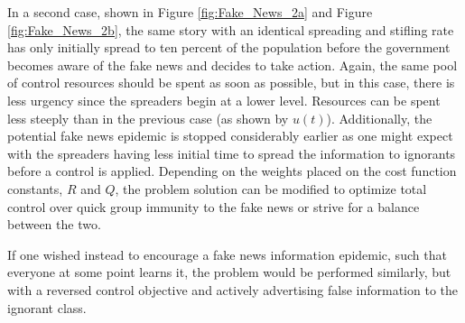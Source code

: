 In a second case, shown in Figure \ref{fig:Fake_News_2a} and Figure \ref{fig:Fake_News_2b}, the same story with an identical spreading and stifling rate has only initially spread to ten percent of the population before the government becomes aware of the fake news and decides to take action. Again, the same pool of control resources should be spent as soon as possible, but in this case, there is less urgency since the spreaders begin at a lower level. Resources can be spent less steeply than in the previous case (as shown by $u(t)$). Additionally, the potential fake news epidemic is stopped considerably earlier as one might expect with the spreaders having less initial time to spread the information to ignorants before a control is applied. Depending on the weights placed on the cost function constants, $R$ and $Q$, the problem solution can be modified to optimize total control over quick group immunity to the fake news or strive for a balance between the two. 

If one wished instead to encourage a fake news information epidemic, such that everyone at some point learns it, the problem would be performed similarly, but with a reversed control objective and actively advertising false information to the ignorant class.